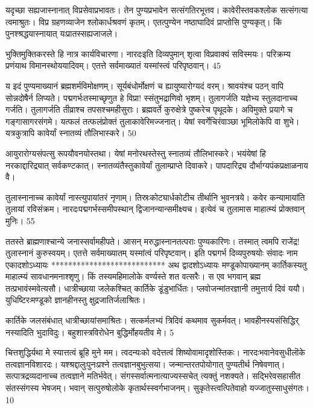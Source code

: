 यदृच्छा सह्यजास्नानात् विप्रसेवाप्रभावतः।
तेन पुण्यप्रभावेन सत्संगतिरभूत्तव।
कावेरीस्तवकश्लोक सत्संगत्या त्वमाश्रुतः।
विप्र ग्रहणव्याजेन श्लोकार्धश्रवणं कृतम्।
एतत्पुण्येन नष्ठाघादिवं प्राप्तोसि पुण्यकृत्।
किं पुनश्श्रद्धयास्नायात् यःप्रातस्सह्यजाजले।

भुक्तिमुक्तिकरस्ते हि नात्र कार्यविचारणा।
नारदःइति दिव्यपुमान् शृत्वा विप्रवाक्यं सविस्मयः।
परिक्रम्य प्रणंयाथ विमानस्थोययादिवम्।
एतत्ते सर्वमाख्यातं यस्मांस्त्वं परिपृष्ठवान्।
45

य इदं पुण्यमाख्यानं ब्रह्मशर्मविमोक्षणम्।
सूर्यबंधोर्मोक्षणं च ह्यायुष्यारोग्यदं वरम्।
श्रावयंश्च पठन् वापि सोन्नदोषैर्न लिप्यते।
पद्मगर्भःतस्माच्छृणुत हे विप्रा! स्संतुभद्राणिवो भृशम्।
तुलागर्जति यज्ञेभ्य स्तुलदानाच्च गर्जति।
तुलागर्जति तीव्राश्च तपसश्चमहीसुराः।
ब्रह्मवर्ते कुरुक्षेत्रे पुष्करेच पृथूदके।
अविमुक्ते प्रयागे च गङ्गासागरसंगमे।
यत्फलं तत्फलंप्रोक्तं तुलाकावेरिमज्जनात्।
येषां स्वर्गेचिरंवाञ्छा भूमिलोकेपि वा शुभे।
यत्रकुत्रापि कावेर्यां स्नातव्यं तौलिभास्करे।
50

आयुरारोग्यसंपत्सु रूपयौवनयोस्तथा।
येषां मनोरथस्तेस्तु स्नातव्यं तौलिभास्करे।
भयंयेषां हि नरकाद्दारिद्र्यात् सर्वकण्टकात्।
स्नातव्यंतैस्तुकावेर्यां तुलाम्प्राप्ते दिवाकरे।
पापदारिद्र्य दौर्भाग्यपंकप्रक्षाळनाय वै।

तुलास्नानाच्च कावेर्यां नास्त्युपायांतरं नृणाम्।
तिस्रःकोट्यार्धकोटीच तीर्थानि भुवनत्रये।
कवेर कन्यामायांति तुलायां रविसंक्रम।
नारदःपद्मगर्भस्समीपस्थान् द्विजानन्यान्समीक्ष्यच।
इत्येवं च तुलामास माहात्म्यं प्रोक्तवान् मुनिः।
55

ततस्ते ब्राह्मणाश्चान्ये जनास्सर्वामहीपते।
आसन् मरुद्धास्नानतत्पराः पुण्यकारिणः।
तस्मात् त्वमपि राजेंद्र! तुलास्नानं कुरुस्वयम्।
एतत्ते सर्वमाख्यातम् यस्मांत्वं परिपृष्टवान्।
इति पद्मगर्भ दिव्यपुरुषयोः संवादः नाम
एकादशोऽध्यायः
***************************
अथ द्वादशोऽध्यायः
मण्डूकोपाख्यानम् कार्तिकस्यतु माहात्म्यं सावधानमनाश्शृणु।
किं तस्यमहिमालोके वर्ण्यस्ते शत वत्सरैः।
स एव भगवान् ब्रह्म तत्प्रभावंस्मवेत्यसौ।
धात्रीच्छाया जलेकश्चित् कार्तिके डूंडुभार्धितः।
प्लवोजन्मांतरज्ञानी तमुत्तार्य दिवं ययौ।
युधिष्टिरःमण्डूको ज्ञानहीनस्तु क्षुद्रजातिर्जलाश्रितः।

कार्तिके जलसंबंधात् धात्रीच्छायांसमाश्रितः।
सत्कर्मलभ्यं त्रिदिवं कथमाव सुकर्मवत्।
भावहीनस्यसंसिद्धिर् नस्यादिति भुदाविदुः।
बहुशास्त्रविरोधेन बुद्धिर्मोहयतीव मे।
5

चित्तशुद्धिर्यथा मे स्यात्तत्वं ब्रूहि मुने मम।
त्वदन्यःको वदेत्तत्वं शिष्योवामादृशोस्तिकः।
नारदःभवानेवसुधीलॊके तत्वज्ञानविशारदः।
यश्श्रद्दालुःपुनःप्रश्ने तत्वज्ञानबुभुत्सया।
जन्मान्तरतपोयोगात् पुण्यतीर्थ निषेवणात्।
सत्पात्रद्रव्यदानाच्च तत्वज्ञाने मतिर्भवेत्।
संगस्सर्वात्मनात्याज्यस्सचेत् त्यक्तुं नशक्यते।
सद्भिरेवसहासीत संतस्संगस्य भेषजम्।
भवान् सत्पुरुषोलोके कृतार्थस्स्वर्गभाजनम्।
सुकृतेस्त्वत्पितेवाहो यज्जातुस्साधुसंगतः।
10

